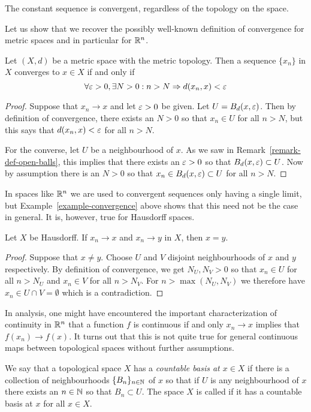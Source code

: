 \begin{example}
  The constant sequence is convergent, regardless of the topology on the space.
\end{example}
Let us show that we recover the possibly well-known definition of convergence for metric spaces and in particular for $\mathbb{R}^n$.
\begin{prop}
  Let $(X,d)$ be a metric space with the metric topology. Then a sequence $\{x_n\}$ in $X$ converges to $x \in X$ if and only if
  \[
    \forall \varepsilon > 0, \exists N > 0 : n > N \Rightarrow d(x_n,x) < \varepsilon
  \] 
\end{prop}
\begin{proof}
  Suppose that $x_n \to x$ and let $\varepsilon > 0$ be given. Let $U = B_d(x,\varepsilon)$. Then by definition of convergence, there exists an $N > 0$ so that $x_n \in U$ for all $n > N$, but this says that $d(x_n,x) < \varepsilon$ for all $n > N$.
  
  For the converse, let $U$ be a neighbourhood of $x$. As we saw in Remark~\ref{remark-def-open-balls}, this implies that there exists an $\varepsilon > 0$ so that $B_d(x,\varepsilon) \subset U$. Now by assumption there is an $N > 0$ so that $x_n \in B_d(x,\varepsilon) \subset U$ for all $n > N$.
\end{proof}
In spaces like $\mathbb{R}^n$ we are used to convergent sequences only having a single limit, but Example~\ref{example-convergence} above shows that this need not be the case in general. It is, however, true for Hausdorff spaces.
\begin{prop}
  Let $X$ be Hausdorff. If $x_n \to x$ and $x_n \to y$ in $X$, then $x = y$.
\end{prop}
\begin{proof}
  Suppose that $x \not= y$. Choose $U$ and $V$ disjoint neighbourhoods of $x$ and $y$ respectively. By definition of convergence, we get $N_U, N_V > 0$ so that $x_n \in U$ for all $n > N_U$ and $x_n \in V$ for all $n > N_V$. For $n > \max(N_U,N_V)$ we therefore have $x_n \in U \cap V = \emptyset$ which is a contradiction.
\end{proof}
In analysis, one might have encountered the important characterization of continuity in $\mathbb{R}^n$ that a function $f$ is continuous if and only $x_n \to x$ implies that $f(x_n) \to f(x)$. It turns out that this is not quite true for general continuous maps between topological spaces without further assumptions.
\begin{defn}
  We say that a topological space $X$ has a \emph{countable basis at $x\in X$} if there is a collection of neighbourhoods $\{B_n\}_{n\in \mathbb{N}}$ of $x$ so that if $U$ is any neighbourhood of $x$ there exists an $n \in \mathbb{N}$ so that $B_n \subset U$. The space $X$ is called  if it has a countable basis at $x$ for all $x \in X$.
\end{defn}
